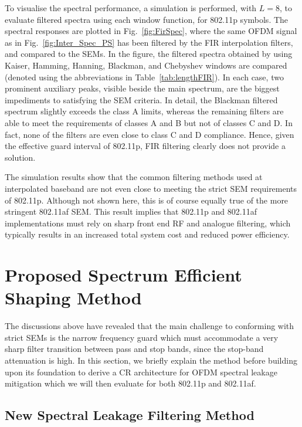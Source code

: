 To visualise the spectral performance, a simulation is performed, with $L=8$, to evaluate filtered spectra using each window function, for 802.11p symbols.
The spectral responses are plotted in Fig.~\ref{fig:FirSpec}, where the same OFDM signal as in Fig.~\ref{fig:Inter_Spec_PS} has been filtered by the FIR interpolation filters, and compared to the SEMs.
In the figure, the filtered spectra obtained by using Kaiser, Hamming, Hanning, Blackman, and Chebyshev windows are compared (denoted using the abbreviations in Table~\ref{tab:lengthFIR}).
In each case, two prominent auxiliary peaks, visible beside the main spectrum, are the biggest impediments to satisfying the SEM criteria.
In detail, the Blackman filtered spectrum slightly exceeds the class A limits, whereas the remaining filters are able to meet the requirements of classes A and B but not of classes C and D. In fact, none of the filters are even close to class C and D compliance.
Hence, given the effective guard interval of 802.11p, FIR filtering clearly does not provide a solution.

The simulation results show that the common filtering methods used at interpolated baseband are not even close to meeting the strict SEM requirements of 802.11p.
Although not shown here, this is of course equally true of the more stringent 802.11af SEM.
This result implies that 802.11p and 802.11af implementations must rely on sharp front end RF and analogue filtering, which typically results in an increased total system cost and reduced power efficiency.

\section{Proposed Spectrum Efficient Shaping Method}
The discussions above have revealed that the main challenge to conforming with strict SEMs is the narrow frequency guard which must accommodate a very sharp filter transition between pass and stop bands, since the stop-band attenuation is high.
In this section, we briefly explain the method before building upon its foundation to derive a CR architecture for OFDM spectral leakage mitigation which we will then evaluate for both 802.11p and 802.11af.

\subsection{New Spectral Leakage Filtering Method}

